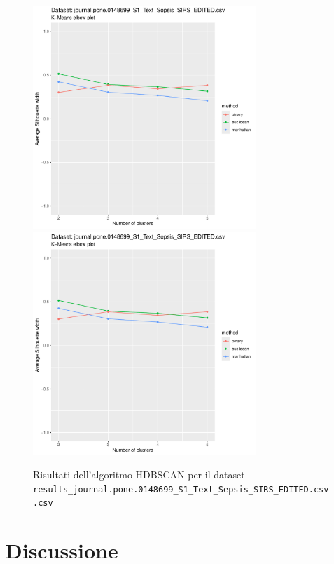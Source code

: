 \documentclass[12pt]{report}
\begin{document}
			\begin{figure}[h]
				\centering
				\includegraphics[width = 0.75\textwidth, height = 0.45\textheight, page = 7]{
					results/results_journal.pone.0148699_S1_Text_Sepsis_SIRS_EDITED.csv.pdf
				}
				\includegraphics[width = 0.75\textwidth, height = 0.45\textheight, page = 8]{
					results/results_journal.pone.0148699_S1_Text_Sepsis_SIRS_EDITED.csv.pdf
				}
				\caption{Risultati dell'algoritmo HDBSCAN per il dataset
				\texttt{results\_journal.pone.0148699\_S1\_Text\_Sepsis\_SIRS\_EDITED.csv.csv}}
				\label{fig:hdbscan5}
			\end{figure}

	\chapter{Discussione}
\end{document}
